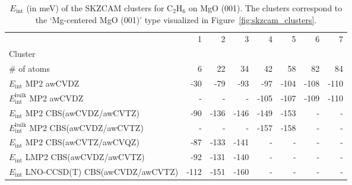 \begin{table}
\caption{\label{tab:system_eint_mgo_c2h6}$E_\textrm{int}$ (in meV) of the SKZCAM clusters for C$_2$H$_6$ on MgO (001). The clusters correspond to the `Mg-centered MgO (001)' type visualized in Figure~\ref{fig:skzcam_clusters}.}
\begin{adjustbox}{center,max width=1.4\textwidth}
\begin{tabular}{lrrrrrrr}
\toprule
 & 1 & 2 & 3 & 4 & 5 & 6 & 7 \\ 
Cluster &  &  &  &  &  &  &  \\
\midrule
\# of atoms & 6 & 22 & 34 & 42 & 58 & 82 & 84 \\
$E_\textrm{int}$ MP2 awCVDZ & -30 & -79 & -93 & -97 & -104 & -108 & -110 \\
$E_\textrm{int}^\textrm{bulk}$ MP2 awCVDZ & - & - & - & -105 & -107 & -109 & -110 \\
$E_\textrm{int}$ MP2 CBS(awCVDZ/awCVTZ) & -90 & -136 & -146 & -149 & -153 & - & - \\
$E_\textrm{int}^\textrm{bulk}$ MP2 CBS(awCVDZ/awCVTZ) & - & - & - & -157 & -158 & - & - \\
$E_\textrm{int}$ MP2 CBS(awCVTZ/awCVQZ) & -87 & -133 & -141 & - & - & - & - \\
$E_\textrm{int}$ LMP2 CBS(awCVDZ/awCVTZ) & -92 & -131 & -140 & - & - & - & - \\
$E_\textrm{int}$ LNO-CCSD(T) CBS(awCVDZ/awCVTZ) & -112 & -151 & -160 & - & - & - & - \\
\bottomrule
\end{tabular}
\end{adjustbox}
\end{table}

